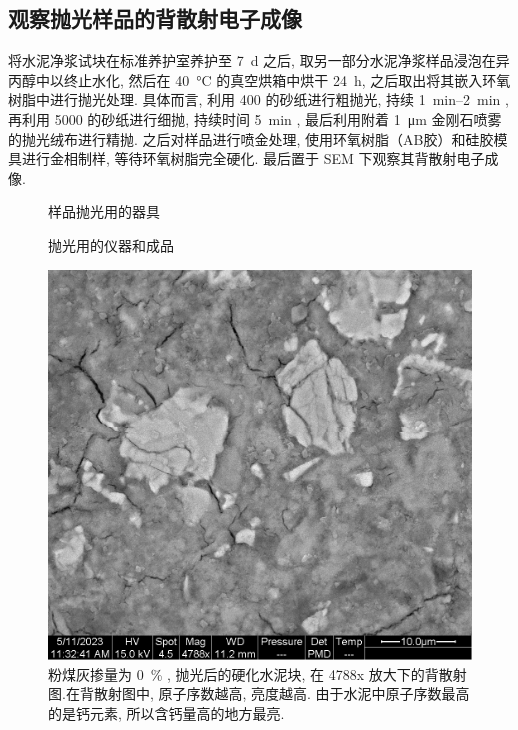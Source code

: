 \subsection{观察抛光样品的背散射电子成像}

将水泥净浆试块在标准养护室养护至 \SI{7}{\day} 之后, 取另一部分水泥净浆样品浸泡在异丙醇中以终止水化, 然后在 \SI{40}{\degreeCelsius} 的真空烘箱中烘干 \SI{24}{\hour}, 之后取出将其嵌入环氧树脂中进行抛光处理. 具体而言, 利用 \SI{400}{} 的砂纸进行粗抛光, 持续 \qtyrange{1}{2}{\minute} , 再利用 \SI{5000}{} 的砂纸进行细抛, 持续时间 \SI{5}{\minute} , 最后利用附着 \SI{1}{\micro\meter} 金刚石喷雾的抛光绒布进行精抛. 
之后对样品进行喷金处理, 使用环氧树脂（AB胶）和硅胶模具进行金相制样, 等待环氧树脂完全硬化. 
最后置于 SEM 下观察其背散射电子成像.


\begin{figure}[!t]
    \centering
     \quad
     \quad
    \caption{样品抛光用的器具}
\end{figure}

\begin{figure}[!t]
    \centering
     \quad
    \caption{抛光用的仪器和成品}
\end{figure}


\begin{figure}
    \centering
    \includegraphics[width = 0.4 \linewidth]{assets/00-polished-04788x-PMD.png}
    \caption{粉煤灰掺量为 \SI{0}{\percent} , 抛光后的硬化水泥块, 在 4788x 放大下的背散射图.在背散射图中, 原子序数越高, 亮度越高. 由于水泥中原子序数最高的是钙元素, 所以含钙量高的地方最亮. }
\end{figure}


